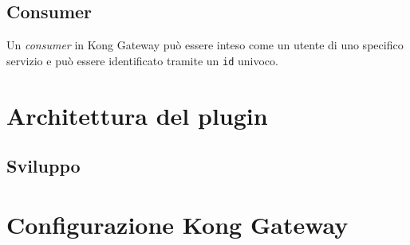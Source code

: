 \subsection{Consumer}\label{sec:kongconsumer}
Un \emph{consumer} in Kong Gateway può essere inteso come un utente di uno specifico servizio e può essere identificato tramite un \texttt{id} univoco.

\section{Architettura del plugin}\label{sec:architetturaplugin}
\subsection{Sviluppo}\label{sec:sviluppoplugin}

\section{Configurazione Kong Gateway}\label{sec:kongconf}